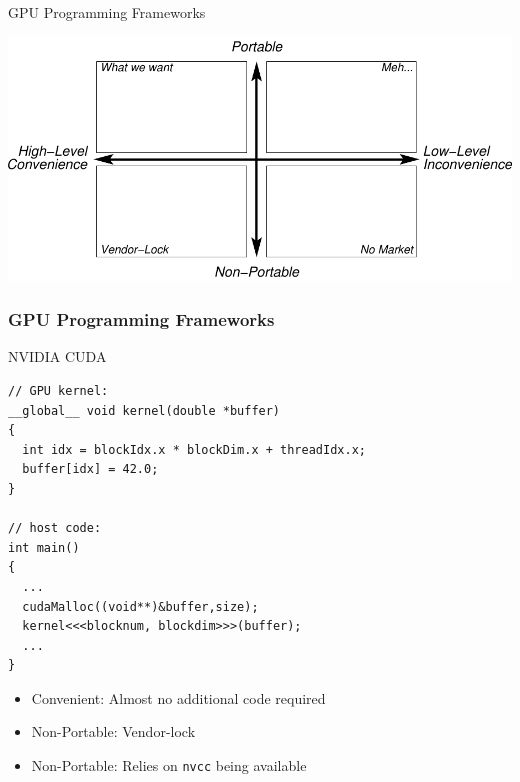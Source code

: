 \begin{frame}[fragile]{GPU Programming Frameworks}
 \begin{center}
  \includegraphics[width=\textwidth]{figures/gpu-programming-comparison-2}
 \end{center}
\end{frame}


\begin{frame}[fragile]
\frametitle{GPU Programming Frameworks}
 \begin{block}{NVIDIA CUDA}
  \begin{lstlisting}
// GPU kernel:
__global__ void kernel(double *buffer)
{
  int idx = blockIdx.x * blockDim.x + threadIdx.x;
  buffer[idx] = 42.0;
}

// host code:
int main()
{ 
  ...
  cudaMalloc((void**)&buffer,size);
  kernel<<<blocknum, blockdim>>>(buffer);
  ...
}
  \end{lstlisting} 

  \begin{itemize}
   \item {\color{darkgreen}Convenient}: Almost no additional code required
   \item {\color{darkred}Non-Portable}: Vendor-lock
   \item {\color{darkred}Non-Portable}: Relies on \lstinline|nvcc| being available
  \end{itemize}
 \end{block}

\end{frame}




